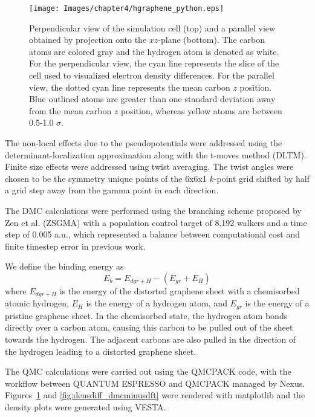 \begin{figure}
    \centering
    \texttt{[image: Images/chapter4/hgraphene\_python.eps]}
    \caption{ Perpendicular view of the simulation cell (top) and a parallel view obtained by projection onto the $xz$-plane (bottom). The carbon atoms are colored gray and the hydrogen atom is denoted as white. For the perpendicular view, the cyan line represents the slice of the cell used to visualized electron density differences. For the parallel view, the dotted cyan line represents the mean carbon $z$ position. Blue outlined atoms are greater than one standard deviation away from the mean carbon $z$ position, whereas yellow atoms are between 0.5-1.0 $\sigma$.}
    \label{fig:cell}
\end{figure}
The non-local effects due to the pseudopotentials were addressed using the determinant-localization approximation along with the t-moves method (DLTM).\cite{10.1063/1.5119729, 10.1063/1.3380831}
Finite size effects were addressed using twist averaging.\cite{10.1103/PhysRevE.64.016702} The twist angles were chosen to be the symmetry unique points of the 6x6x1 $k$-point grid shifted by half a grid step away from the gamma point in each direction.

The DMC calculations were performed using the branching scheme proposed by Zen
et al. (ZSGMA)\cite{10.1103/PhysRevB.93.241118} with a population control target of 8,192 walkers and a time step of 0.005 a.u., which represented a balance between computational cost and finite timestep error in previous work.\cite{10.1103/PhysRevB.100.075430}



We define the binding energy as
\begin{equation}
E_b=E_{dgr+H}-(E_{gr}+E_{H})
\label{eq:binding}
\end{equation}
where $E_{dgr+H}$ is the energy of the distorted graphene sheet with a chemisorbed atomic hydrogen, $E_H$ is the energy of a hydrogen atom, and $E_{gr}$ is the energy of a pristine graphene sheet.
In the chemisorbed state, the hydrogen atom bonds directly over a carbon atom, causing this carbon to be pulled out of the sheet towards the hydrogen.\cite{10.1063/1.4896611,10.1126/science.aaw6378} 
The adjacent carbons are also pulled in the direction of the hydrogen leading to a distorted graphene sheet.


The QMC calculations were carried out using the QMCPACK code, with the workflow between QUANTUM ESPRESSO and QMCPACK managed by Nexus.\cite{10.1088/1361-648X/aab9c3,10.1063/5.0004860,10.1016/j.cpc.2015.08.012}
Figures~\ref{fig:cell} and \ref{fig:densdiff_dmcminusdft} were rendered with matplotlib\cite{10.1109/MCSE.2007.55} and the density plots were generated using VESTA.\cite{10.1107/S0021889811038970}
